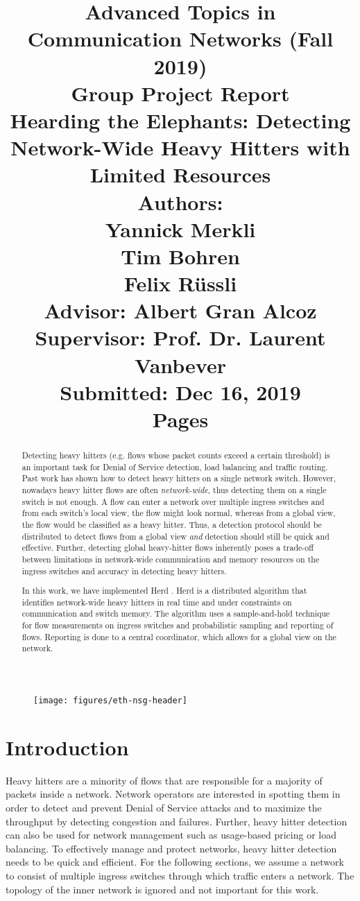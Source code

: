 \documentclass[11pt,oneside,a4paper]{article}
\title{
    \vspace*{0.0mm}
    \LARGE\bf\sf Advanced Topics in \\Communication Networks (Fall 2019)
    \vspace*{10.0mm} \\
    \Large\bf\sf Group Project Report \vspace*{30.0mm}\\
    \Huge\bf\sf Hearding the Elephants: Detecting Network-Wide Heavy Hitters with Limited Resources
    \vspace*{30.0mm} \\
    \normalsize
    \sf Authors:\\[5pt]
    \sf Yannick Merkli\\ [5pt]
    \sf Tim Bohren\\ [5pt]
    \sf Felix Rüssli \vspace*{5mm}\\
    \sf  Advisor: Albert Gran Alcoz \vspace*{5mm}\\
    \sf  Supervisor:  Prof. Dr. Laurent Vanbever \vspace*{20.0mm}\\
    \sf Submitted: Dec 16, 2019\\ [5pt]
    \sf \pageref{lastpage} Pages
}
\date{}
\begin{document}
\begin{figure}
    \texttt{[image: figures/eth-nsg-header]}
\end{figure}

\maketitle
\thispagestyle{empty}
\raggedbottom
\clearpage


\begin{abstract}
\noindent Detecting heavy hitters (e.g. flows whose packet counts exceed a certain threshold) is an important task for Denial of Service detection, load balancing and traffic routing. Past work has shown how to detect heavy hitters on a single network switch. However, nowadays heavy hitter flows are often \textit{network-wide}, thus detecting them on a single switch is not enough. A flow can enter a network over multiple ingress switches and from each switch's local view, the flow might look normal, whereas from a global view, the flow would be classified as a heavy hitter. Thus, a detection protocol should be distributed to detect flows from a global view \textit{and} detection should still be quick and effective. Further, detecting global heavy-hitter flows inherently poses a trade-off between limitations in network-wide communication and memory resources on the ingress switches and accuracy in detecting heavy hitters.

In this work, we have implemented Herd \cite{anon2019herd}. Herd is a distributed algorithm that identifies network-wide heavy hitters in real time and under constraints on communication and switch memory. The algorithm uses a sample-and-hold technique for flow measurements on ingress switches and probabilistic sampling and reporting of flows. Reporting is done to a central coordinator, which allows for a global view on the network.

\end{abstract}

\clearpage
\setcounter{tocdepth}{2}
\tableofcontents
\clearpage
{}

\section{Introduction}

Heavy hitters are a minority of flows that are responsible for a majority of packets inside a network. Network operators are interested in spotting them in order to detect and prevent Denial of Service attacks and to maximize the throughput by detecting congestion and failures. Further, heavy hitter detection can also be used for network management such as usage-based pricing or load balancing. To effectively manage and protect networks, heavy hitter detection needs to be quick and efficient. For the following sections, we assume a network to consist of multiple ingress switches through which traffic enters a network. The topology of the inner network is ignored and not important for this work.
\end{document}
